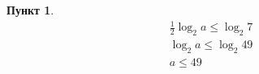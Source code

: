 \documentclass[11pt,a4paper]{scrarticle}
\theoremstyle{definition}
\newtheorem{subtask}{Пункт}
\begin{document}
\begin{subtask}
  \begin{gather*}
    \frac{1}{2} \log_2 a \leq \log_2 7 \\
    \log_2 a \leq \log_2 49 \\
    a \leq 49
  \end{gather*}

\end{subtask}
\end{document}
